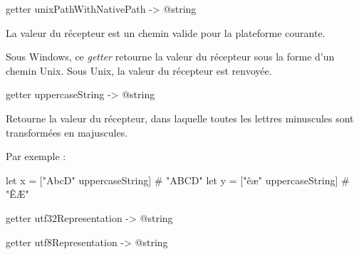 
\begin{galgasbox}
getter unixPathWithNativePath -> @string
\end{galgasbox}

La valeur du récepteur est un chemin valide pour la plateforme courante.

Sous Windows, ce \emph{getter} retourne la valeur du récepteur sous la forme d'un chemin Unix. Sous Unix, la valeur du récepteur est renvoyée.














\begin{galgasbox}
getter uppercaseString -> @string
\end{galgasbox}

Retourne la valeur du récepteur, dans laquelle toutes les lettres minuscules sont transformées en majuscules.

Par exemple :
\begin{galgas}
let x = ["AbcD" uppercaseString] # "ABCD"
let y = ["êæ" uppercaseString] # "ÊÆ"
\end{galgas}















\begin{galgasbox}
getter utf32Representation -> @string
\end{galgasbox}
















\begin{galgasbox}
getter utf8Representation -> @string
\end{galgasbox}

